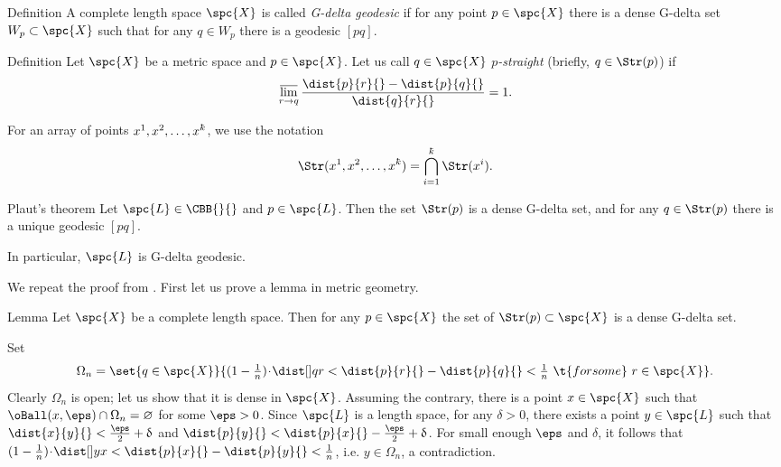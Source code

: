 \begin{thm}{Definition}\label{def:alm-geod}
A complete length space $\spc{X}$ is called \emph{G-delta geodesic} 
if for any point $p\in \spc{X}$ there is a dense G-delta set $W_p\subset\spc{X}$ such that for any $q\in W_p$ there is a geodesic $[p q]$.
\end{thm}

\begin{thm}{Definition}\label{def:straight}
Let $\spc{X}$ be a metric space 
and $p\in \spc{X}$.
Let us call $q\in \spc{X}$ \emph{$p$-straight} (briefly, $q\in \Str(p)$) if
\[\limsup_{r\to q}\frac{\dist{p}{r}{}-\dist{p}{q}{}}{\dist{q}{r}{}}=1.\]

For an array of points $x^1,x^2,\dots,x^\kay$, 
we use the notation
\[\Str(x^1,x^2,\dots,x^\kay)=\bigcap_{i=1}^\kay\Str(x^i).\]
\end{thm}

\begin{thm}{Plaut's theorem}\label{thm:almost.geod}
Let $\spc{L}\in\CBB{}{}$ and $p\in \spc{L}$.
Then the set $\Str(p)$ is a dense G-delta set, 
and for any $q\in \Str(p)$ there is a unique geodesic $[p q]$.

In particular, $\spc{L}$ is G-delta geodesic.
\end{thm}

We repeat the proof from \cite[Th. 27]{plaut:survey}.
First let us prove a lemma in metric geometry.

\begin{thm}{Lemma}\label{lem:straight}
Let $\spc{X}$ be a complete length space. 
Then for any $p\in \spc{X}$ the set of $\Str(p)\subset\spc{X}$ is a dense G-delta set.
\end{thm}

Set 
\[\Omega_n
=
\set{q\in \spc{X}}{(1-\tfrac{1}{n})\cdot\dist[{{}}]{q}{r}{}<
\dist{p}{r}{}-\dist{p}{q}{}
<\tfrac{1}{n}\ \t{for some}\ r\in \spc{X}}.\]
Clearly $\Omega_n$ is open; 
let us show that it is dense in $\spc{X}$.
Assuming the contrary, there is a point $x\in \spc{X}$ such that $\oBall(x,\eps)\cap \Omega_n=\emptyset$ for some $\eps>0$.
Since $\spc{L}$ is a length space, 
for any $\delta>0$, there exists a point $y\in \spc{L}$ such that $\dist{x}{y}{}<\tfrac\eps2+\delta$ and $\dist{p}{y}{}<\dist{p}{x}{}-\tfrac\eps2+\delta$. 
For small enough $\eps$ and $\delta$, 
it follows that $(1-\tfrac{1}{n})\cdot\dist[{{}}]{y}{x}{}
<
\dist{p}{x}{}-\dist{p}{y}{}<\tfrac{1}{n}$, 
i.e. $y\in\Omega_n$, 
a contradiction.

